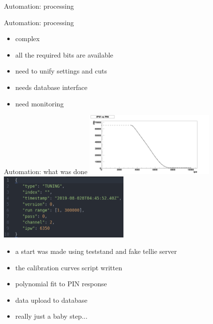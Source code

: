 \documentclass[xcolor=table]{beamer}
\begin{document}
\begin{frame}{Automation: processing}
\noindent{}
\end{frame}

\begin{frame}{Automation: processing}
\begin{itemize}
	\item complex
	\item all the required bits are available
	\item need to unify settings and cuts
	\item needs database interface
	\item need monitoring
\end{itemize}
\end{frame}

\begin{frame}{Automation: what was done}
\includegraphics[width=0.49\textwidth]{plots/fit.png}
\includegraphics[width=0.49\textwidth]{plots/table.png}
\begin{itemize}
	\item a start was made using teststand and fake tellie server
	\item the calibration curves script written
	\item polynomial fit to PIN response
	\item data upload to database
	\item really just a baby step...
\end{itemize}
\end{frame}
\end{document}
